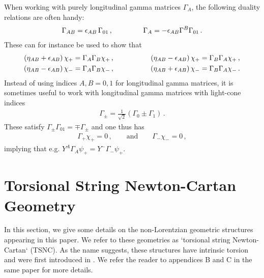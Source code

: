 \documentclass[a4paper,10pt,openany]{article}
\newcommand{\lr}{\left(}
\newcommand{\rr}{\right)}
\begin{document}
	When working with purely longitudinal gamma matrices $\Gamma_A$, the following duality relations are often handy:
	\begin{align}
		\Gamma_{AB}=\epsilon_{AB}\,\Gamma_{01}\,,\hskip 1.5truecm \Gamma_A = -\epsilon_{AB}\Gamma^B\Gamma_{01}\,.
	\end{align}
	These can for instance be used to show that
	\begin{alignat}{2}\label{eq:etaepsilongammagamma}
		\lr\eta_{AB} + \epsilon_{AB}\rr\chi_+ &= \Gamma_A\Gamma_B\chi_+\,,\hskip 1.5truecm & \lr\eta_{AB} - \epsilon_{AB}\rr\chi_+ &= \Gamma_B\Gamma_A\chi_+\,, \nonumber \\
		\lr\eta_{AB} - \epsilon_{AB}\rr\chi_- &= \Gamma_A\Gamma_B\chi_-\,,\hskip 1.5truecm & \lr\eta_{AB} + \epsilon_{AB}\rr\chi_- &= \Gamma_B\Gamma_A\chi_-\,.
	\end{alignat}
	Instead of using indices $A,B = 0,1$ for longitudinal gamma matrices, it is sometimes useful to work with longitudinal gamma matrices with light-cone indices
	\begin{align}
		\Gamma_\pm = \frac{1}{\sqrt{2}}\left(\Gamma_0\pm\Gamma_1\right) \,.
	\end{align}
	These satisfy $\Gamma_\pm\Gamma_{01} = \mp\Gamma_\pm$ and one thus has
	\begin{align}\label{eq:selfduality}
		\Gamma_+\chi_+=0\,,\qquad\mathrm{and}\qquad \Gamma_-\chi_-=0\,,
	\end{align}
	implying that e.g. $Y^A\Gamma_A\psi_+ = Y^-\Gamma_-\psi_+$.\\
	
	\section{Torsional String Newton-Cartan Geometry} \label{sec:TSNC}
	\noindent In this section, we give some details on the non-Lorentzian geometric structures appearing in this paper. We refer to these geometries as `torsional string Newton-Cartan` (TSNC). As the name suggests, these structures have intrinsic torsion and were first introduced in \cite{Bergshoeff:2021bmc}. We refer the reader to appendices B and C in the same paper for more details.
	
\end{document}
